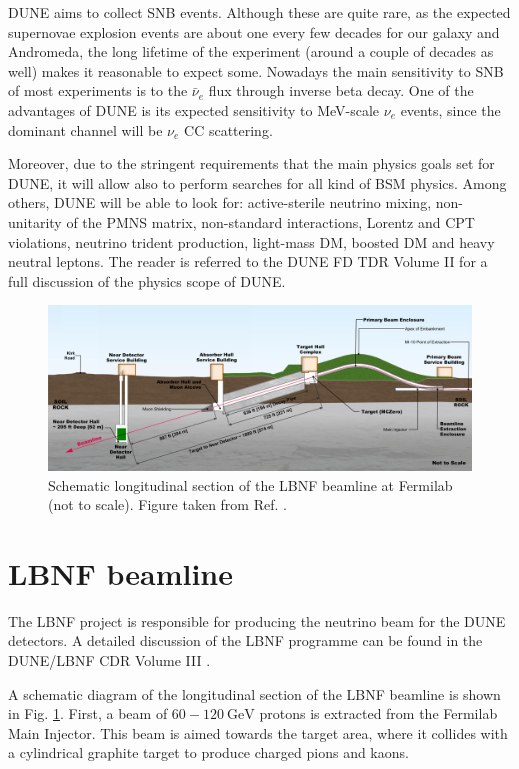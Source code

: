 DUNE aims to collect SNB events. Although these are quite rare, as the expected supernovae explosion events are about one every few decades for our galaxy and Andromeda, the long lifetime of the experiment (around a couple of decades as well) makes it reasonable to expect some. Nowadays the main sensitivity to SNB of most experiments is to the $\bar{\nu}_{e}$ flux through inverse beta decay. One of the advantages of DUNE is its expected sensitivity to MeV-scale $\nu_{e}$ events, since the dominant channel will be $\nu_{e}$ CC scattering.

Moreover, due to the stringent requirements that the main physics goals set for DUNE, it will allow also to perform searches for all kind of BSM physics. Among others, DUNE will be able to look for: active-sterile neutrino mixing, non-unitarity of the PMNS matrix, non-standard interactions, Lorentz and CPT violations, neutrino trident production, light-mass DM, boosted DM and heavy neutral leptons. The reader is referred to the DUNE FD TDR Volume II \cite{DUNE2020TDR2} for a full discussion of the physics scope of DUNE.

\begin{figure}[t]
	\centering
	\includegraphics[width=0.95\linewidth]{Images/DUNE/LBNF/beamline-sideview}
	\caption[Schematic longitudinal section of the LBNF beamline at Fermilab.]{Schematic longitudinal section of the LBNF beamline at Fermilab (not to scale). Figure taken from Ref. \cite{DUNE2016CDR3}.}
	\label{fig:lbnf_beamline}
\end{figure}

\section{LBNF beamline}

The LBNF project is responsible for producing the neutrino beam for the DUNE detectors. A detailed discussion of the LBNF programme can be found in the DUNE/LBNF CDR Volume III \cite{DUNE2016CDR3}.

A schematic diagram of the longitudinal section of the LBNF beamline is shown in Fig. \ref{fig:lbnf_beamline}. First, a beam of $60-120~\mathrm{GeV}$ protons is extracted from the Fermilab Main Injector. This beam is aimed towards the target area, where it collides with a cylindrical graphite target to produce charged pions and kaons.

